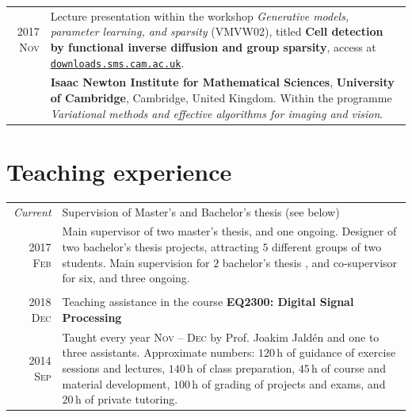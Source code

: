\documentclass[a4paper,10pt]{article}
\begin{document}
\begin{longtable}[H]{r|p{13.5cm}}
      \textsc{2017 Nov} & Lecture presentation within the workshop \emph{Generative models, 
			  parameter learning, and sparsity} (VMVW02), titled
			  \textbf{Cell detection by functional inverse diffusion and group sparsity},
			  access at \href{https://downloads.sms.cam.ac.uk/2600830/2600858.mp4}{\texttt{downloads.sms.cam.ac.uk}}. \\
			& \footnotesize{\textbf{Isaac Newton Institute for Mathematical Sciences},
			  \textbf{University of Cambridge}, Cambridge, United Kingdom.
			  Within the programme \emph{Variational methods and effective
			  algorithms for imaging and vision}.}\\

    \end{longtable}
  
  \section{Teaching experience}
  
    \begin{bibunit}
    \begin{tabular}{r|p{13cm}}
      
      \emph{Current}	 & Supervision of Master's and Bachelor's thesis (see below) \\
      \textsc{2017 Feb}  & \footnotesize{Main supervisor of two master's thesis, \cite{Jones2018} and one
                            ongoing. 
							Designer of two bachelor's thesis projects, attracting $5$ 
							different groups of two students. Main supervision for $2$ bachelor's 
							thesis \cite{F2A2018,F2B2018}, and co-supervisor for six,
							\cite{F3A2018,F3B2018,F3C2018} and three ongoing. } \\      
      \multicolumn{2}{c}{} \\
      
	  \textsc{2018 Dec}     & Teaching assistance in the course \textbf{EQ2300: Digital Signal Processing} \\
	  \textsc{2014 Sep} & \footnotesize{Taught every year \textsc{Nov -- Dec} by Prof. Joakim Jald\'{e}n and 
							one to three assistants. Approximate numbers: $120\,\mathrm{h}$ of guidance of 
							exercise sessions and lectures, $140\,\mathrm{h}$ of 
							class preparation, $45\,\mathrm{h}$ of course and material development,
							$100\,\mathrm{h}$ of grading of projects and exams, and $20\,\mathrm{h}$ of private tutoring.} \\
     
    \end{tabular}

	
      \renewcommand\refname{\normalsize{Supervised theses}}
	  \footnotesize{
      }
	\end{bibunit}
  
\end{document}
